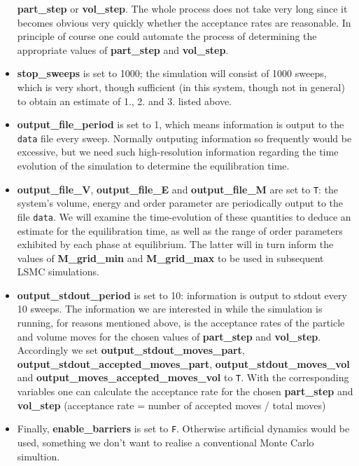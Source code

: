 \documentclass{report}
\begin{document}
\begin{itemize}
  \textbf{part\_step} or \textbf{vol\_step}. The whole process does not take very long since it becomes obvious very quickly whether the acceptance
  rates are reasonable. In principle of course one could automate the process of determining the appropriate values of \textbf{part\_step}
  and \textbf{vol\_step}.
\item \textbf{stop\_sweeps} is set to 1000; the simulation will consist of 1000 sweeps, which is very short, though sufficient (in this system, though
  not in general) to obtain an estimate of 1., 2. and 3. listed above. 
\item \textbf{output\_file\_period} is set to 1, which means information is output to the \texttt{data} file every sweep. Normally outputing information
  so frequently would be excessive, but we need such high-resolution information regarding the time evolution of the simulation to 
  determine the equilibration time.
\item \textbf{output\_file\_V}, \textbf{output\_file\_E} and \textbf{output\_file\_M} are set to \texttt{T}: the system's volume, energy and order parameter 
  are periodically output to the file \texttt{data}. We will examine the time-evolution of these quantities to deduce an estimate for the equilibration
  time, as well as the range of order parameters exhibited by each phase at equilibrium. The latter will in turn inform the values of 
  \textbf{M\_grid\_min} and \textbf{M\_grid\_max} to be used in subsequent LSMC simulations.
\item \textbf{output\_stdout\_period} is set to 10: information is output to stdout every 10 sweeps. The information we are interested in while the simulation
  is running, for reasons mentioned above, is the acceptance rates of the particle and volume moves for the chosen values of \textbf{part\_step} and 
  \textbf{vol\_step}. Accordingly we set \textbf{output\_stdout\_moves\_part}, \textbf{output\_stdout\_accepted\_moves\_part}, 
  \textbf{output\_stdout\_moves\_vol} and \textbf{output\_moves\_accepted\_moves\_vol} to \texttt{T}. With the corresponding variables one can
  calculate the acceptance rate for the chosen  \textbf{part\_step} and \textbf{vol\_step} (acceptance rate = number of accepted moves / total moves)
\item Finally, \textbf{enable\_barriers} is set to \texttt{F}. Otherwise artificial dynamics would be used, something we don't want to realise a conventional
  Monte Carlo simultion.
\end{itemize}
\end{document}
